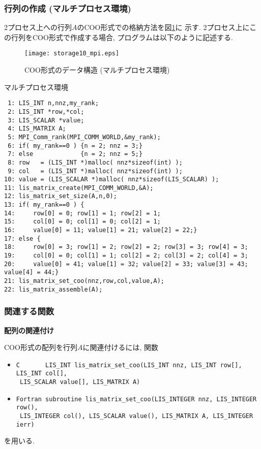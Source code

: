 \documentclass[a4paper]{jarticle}
\begin{document}
{{\subsubsection{行列の作成 (マルチプロセス環境)}
2プロセス上への行列$A$のCOO形式での格納方法を図\ref{fig:storage10_mpi}に
示す. 
2プロセス上にこの行列をCOO形式で作成する場合, プログラムは以下のように記述する. 
\begin{figure}[h]
{\centering 
\texttt{[image: storage10\_mpi.eps]} 
\caption{COO形式のデータ構造 (マルチプロセス環境)}\label{fig:storage10_mpi}}
\end{figure}
\begin{itembox}[l]{マルチプロセス環境}
\small
\begin{verbatim}
 1: LIS_INT n,nnz,my_rank;
 2: LIS_INT *row,*col;
 3: LIS_SCALAR *value;
 4: LIS_MATRIX A;
 5: MPI_Comm_rank(MPI_COMM_WORLD,&my_rank);
 6: if( my_rank==0 ) {n = 2; nnz = 3;}
 7: else             {n = 2; nnz = 5;}
 8: row   = (LIS_INT *)malloc( nnz*sizeof(int) );
 9: col   = (LIS_INT *)malloc( nnz*sizeof(int) );
10: value = (LIS_SCALAR *)malloc( nnz*sizeof(LIS_SCALAR) );
11: lis_matrix_create(MPI_COMM_WORLD,&A);
12: lis_matrix_set_size(A,n,0);
13: if( my_rank==0 ) {
14:     row[0] = 0; row[1] = 1; row[2] = 1;
15:     col[0] = 0; col[1] = 0; col[2] = 1;
16:     value[0] = 11; value[1] = 21; value[2] = 22;}
17: else {
18:     row[0] = 3; row[1] = 2; row[2] = 2; row[3] = 3; row[4] = 3;
19:     col[0] = 0; col[1] = 1; col[2] = 2; col[3] = 2; col[4] = 3;
20:     value[0] = 41; value[1] = 32; value[2] = 33; value[3] = 43; value[4] = 44;}
21: lis_matrix_set_coo(nnz,row,col,value,A);
22: lis_matrix_assemble(A);
\end{verbatim}
\end{itembox}

\subsubsection{関連する関数}
\noindent
{\bf 配列の関連付け}

COO形式の配列を行列$A$に関連付けるには, 関数
\begin{itemize}
\item \verb|C       LIS_INT lis_matrix_set_coo(LIS_INT nnz, LIS_INT row[], LIS_INT col[],|\\
      \verb| LIS_SCALAR value[], LIS_MATRIX A)|
\item \verb|Fortran subroutine lis_matrix_set_coo(LIS_INTEGER nnz, LIS_INTEGER row(),|\\
      \verb| LIS_INTEGER col(), LIS_SCALAR value(), LIS_MATRIX A, LIS_INTEGER ierr)|
\end{itemize}
を用いる. 

}}
\end{document}
